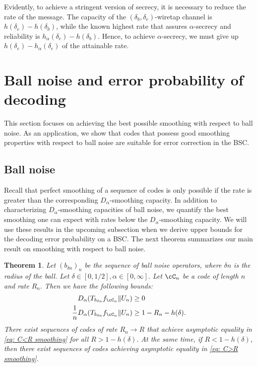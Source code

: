 \documentclass{amsart}
\newtheorem{theorem}{Theorem}[section]
\theoremstyle{remark}
\begin{document}
Evidently, to achieve a stringent version of secrecy, it is necessary to reduce the rate of the message. The capacity of the $(\delta_b,\delta_e)$-wiretap channel is $h(\delta_e) - h(\delta_b)$, while the known highest rate that assures $\alpha$-secrecy and reliability is $h_{\alpha}(\delta_e) - h(\delta_b)$. Hence, to achieve $\alpha$-secrecy, we must give up  $h(\delta_e) - h_{\alpha}(\delta_e)$ of the attainable rate.

\section{Ball noise and error probability of decoding}\label{sec: ball noise}
This section focuses on achieving the best possible smoothing with respect to ball noise. As an application, we show that codes that possess good smoothing properties with respect to ball noise are suitable for error correction in the BSC.

\subsection{Ball noise} Recall that perfect smoothing of a sequence of codes is only possible if the rate is greater than the corresponding $D_{\alpha}$-smoothing capacity. In addition to characterizing $D_{\alpha}$-smoothing capacities of ball noise, we quantify the best smoothing one can expect with rates below the $D_{\alpha}$-smoothing capacity. We will use these results in the upcoming subsection when we derive upper bounds for the decoding error probability on a BSC. The next theorem summarizes our main result on smoothing with respect to ball noise.

\begin{theorem}\label{Thm: ball noise D_alpha sm bounds}
 Let $\left(b_{\delta n}\right)_n$ be the sequence of ball noise operators, where $\delta n$ is the radius of the ball. 
Let $\delta\in[0,1/2],\alpha\in[0,\infty].$ 
Let $\cC_n$ be a code of length $n$ and rate $R_n.$ 
Then we have the following bounds: 
\begin{align}
    D_{\alpha}(T_{b_{\delta n}}f_{\cC_n}\|U_n) &\geq 0      \label{eq: C<R smoothing} \\ 
    \frac{1}{n}D_{\alpha}(T_{b_{\delta n}}f_{\cC_n}\|U_n) &\geq 1-R_n-h(\delta). \label{eq: C>R smoothing}
\end{align}
There exist sequences of codes of rate $R_n\to R$ that achieve asymptotic equality in \eqref{eq: C<R smoothing} for all $R>1-h(\delta).$ 
At the same time, if $R<1-h(\delta)$, then there exist sequences of codes achieving asymptotic equality in \eqref{eq: C>R smoothing}.
\end{theorem}
\end{document}
